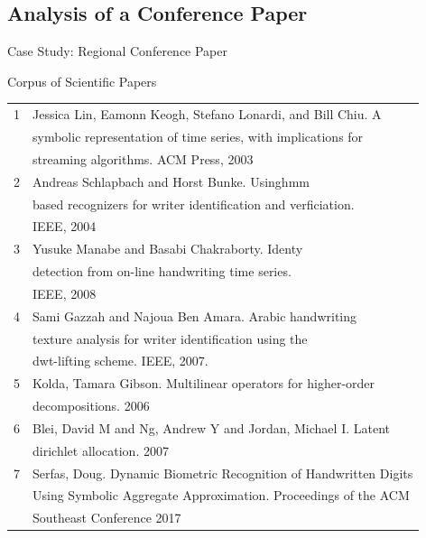\documentclass[handout]{beamer}
\begin{document}
\subsection{Analysis of a Conference Paper}
\begin{frame}{Case Study: Regional Conference Paper}
  \begin{table}
    \centering
    \tiny
    Corpus of Scientific Papers\\
  \begin{tabular}{|l|l|}
    \hline
    1 & Jessica Lin, Eamonn Keogh, Stefano Lonardi, and Bill Chiu. A\\
      & symbolic representation of time series, with implications
        for\\
      & streaming algorithms.  ACM Press, 2003\\
    \hline
    2 & Andreas Schlapbach and Horst Bunke. Usinghmm\\
      & based recognizers for writer identification and
        verficiation.\\
      & IEEE, 2004\\
    \hline
    3 & Yusuke Manabe and Basabi Chakraborty. Identy\\
      & detection from on-line handwriting time series.\\
      & IEEE, 2008\\
    \hline
    4 & Sami Gazzah and Najoua Ben Amara. Arabic handwriting \\
      & texture analysis for writer identification using the \\
      & dwt-lifting scheme.  IEEE, 2007.\\
    \hline
    5 & Kolda, Tamara Gibson. Multilinear operators for higher-order \\
      & decompositions. 2006\\
    \hline
    6 & Blei, David M and Ng, Andrew Y and Jordan, Michael I. Latent\\
      & dirichlet allocation. 2007\\
    \hline
    7 & Serfas, Doug. Dynamic Biometric Recognition of Handwritten Digits\\
      & Using Symbolic Aggregate Approximation. Proceedings of the ACM\\
      & Southeast Conference 2017\\
    \hline
  \end{tabular}
\end{table}
\end{frame}
\end{document}
